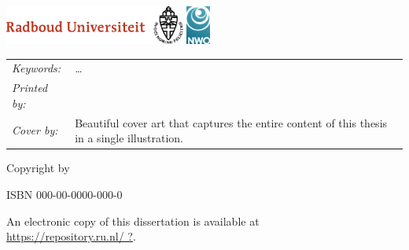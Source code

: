 \begin{titlepage}
    \medskip

    \vfill
    \begin{center}
        \includegraphics[height=0.5in]{_logos/Logo_RU_NL_RGB.pdf}
        \hspace{2em}
        \includegraphics[height=0.5in]{_logos/NWO.jpg}
    \end{center}
    \vfill

    \noindent
    \begin{tabular}{@{}p{}@{}p{}@{}}
        \textit{Keywords:}    & \ldots                                                                                        \\[\medskipamount]
        \textit{Printed by:}   &                                                                             \\[\medskipamount]
        \textit{Cover by:} & Beautiful cover art that captures the entire content of this thesis in a single illustration.
    \end{tabular}

    \vspace{4\bigskipamount}

    \noindent Copyright \textcopyright{} \the\year{} by{
        \makeatletter
        \@initials~\@lastname
        \makeatother
    }


    \medskip
    \noindent ISBN 000-00-0000-000-0

    \medskip
    \noindent An electronic copy of this dissertation is available at\\
    \url{https://repository.ru.nl/ ?}.

\end{titlepage}

